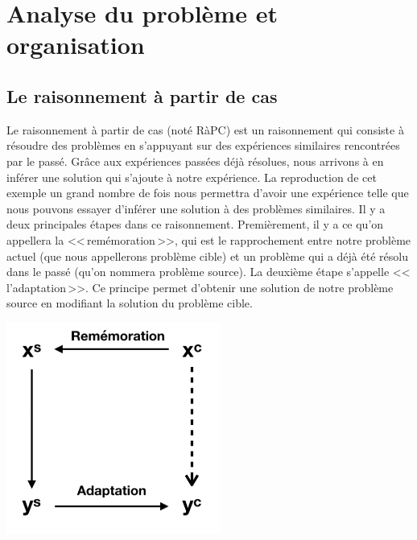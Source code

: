 \documentclass[11pt]{article}
\begin{document}
\cleardoublepage


\section{Analyse du probl\`{e}me et organisation}

\subsection{Le raisonnement \`{a} partir de cas}
Le raisonnement \`{a} partir de cas (not\'{e} R\`{a}PC) est un raisonnement qui consiste \`{a} r\'{e}soudre des probl\`{e}mes en s'appuyant sur des exp\'{e}riences similaires rencontr\'{e}es par le pass\'{e}. Gr\^{a}ce aux exp\'{e}riences pass\'{e}es d\'{e}j\`{a} r\'{e}solues, nous arrivons \`{a} en inf\'{e}rer une solution qui s'ajoute \`{a} notre exp\'{e}rience. La reproduction de cet exemple un grand nombre de fois nous permettra d'avoir une exp\'{e}rience telle que nous pouvons essayer d'inf\'{e}rer une solution \`{a} des
probl\`{e}mes similaires.
\newline
\newline
Il y a deux principales \'{e}tapes dans ce raisonnement. Premi\`{e}rement, il y a ce qu'on appellera la <<\,rem\'{e}moration\,>>, qui est le rapprochement entre notre probl\`{e}me actuel (que nous appellerons probl\`{e}me cible) et un probl\`{e}me qui a d\'{e}j\`{a} \'{e}t\'{e} r\'{e}solu dans le pass\'{e} (qu'on nommera probl\`{e}me source). La deuxi\`{e}me \'{e}tape s'appelle <<\,l'adaptation\,>>. Ce principe permet d'obtenir une solution de notre probl\`{e}me source en modifiant la solution du probl\`{e}me cible.
\newline
\newline
\begin{center}
\includegraphics[width=7cm]{img1.png} %
\end{center}
\end{document}
